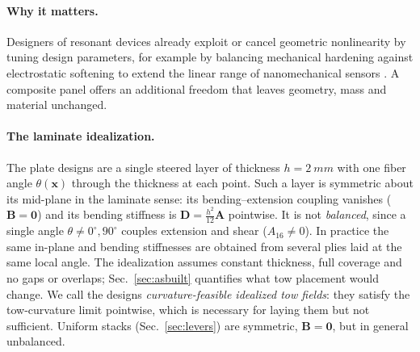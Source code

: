 \paragraph{Why it matters.} Designers of resonant devices already exploit or cancel
geometric nonlinearity by tuning design parameters, for example by balancing mechanical
hardening against electrostatic softening to extend the linear range of nanomechanical
sensors \cite{kacem2009}. A composite panel offers an additional freedom that leaves
geometry, mass and material unchanged.

\begin{center}
\end{center}

\paragraph{The laminate idealization.} The plate designs are a single steered layer of
thickness $h=\SI{2}{mm}$ with one fiber angle $\theta(\bm x)$ through the thickness at each
point. Such a layer is symmetric about its mid-plane in the laminate sense: its
bending--extension coupling vanishes ($\bm B=\bm 0$) and its bending stiffness is
$\bm D=\tfrac{h^2}{12}\bm A$ pointwise. It is not \emph{balanced}, since a single angle
$\theta\neq0^\circ,90^\circ$ couples extension and shear ($A_{16}\neq0$). In practice the
same in-plane and bending stiffnesses are obtained from several plies laid at the same local
angle. The idealization assumes constant thickness, full coverage and no gaps or overlaps;
Sec.~\ref{sec:asbuilt} quantifies what tow placement would change. We call the designs
\emph{curvature-feasible idealized tow fields}: they satisfy the tow-curvature limit
pointwise, which is necessary for laying them but not sufficient. Uniform stacks
(Sec.~\ref{sec:levers}) are symmetric, $\bm B=\bm 0$, but in general unbalanced.

